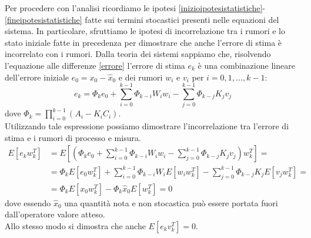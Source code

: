 Per procedere con l'analisi ricordiamo le ipotesi \eqref{inizioipotesistatistiche}-\eqref{fineipotesistatistiche} fatte sui termini stocastici presenti nelle equazioni del sistema.
In particolare, sfruttiamo le ipotesi di incorrelazione tra i rumori e lo stato iniziale fatte in precedenza per dimostrare che anche l'errore di stima è incorrelato con i rumori.
Dalla teoria dei sistemi sappiamo che, risolvendo l'equazione alle differenze \eqref{errore} l'errore di stima $e_k$ è una combinazione lineare dell'errore iniziale $e_0=x_0-\hat{x}_0$ e dei rumori $w_i$ e $v_i$ per $i=0,1,...,k-1$:
\begin{equation}
e_k=\Phi_{k}e_0 + \sum_{i=0}^{k-1}\Phi_{k-i}W_iw_i - \sum_{j=0}^{k-1}\Phi_{k-j}K_jv_j
\end{equation}
dove $\Phi_{k}=\prod_{i=0}^{k-1}(A_i-K_iC_i)$.\\
Utilizzando tale espressione possiamo dimostrare l'incorrelazione tra l'errore di stima e i rumori di processo e misura.
\begin{equation}
\begin{split}
E[e_kw_k^T]&=E[(\Phi_{k}e_0 + \sum_{i=0}^{k-1}\Phi_{k-i}W_iw_i - \sum_{j=0}^{k-1}\Phi_{k-j}K_jv_j)w_k^T]=\\
&=\Phi_kE[e_0w_k^T] + \sum_{i=0}^{k-1}\Phi_{k-i}W_iE[w_iw_k^T] - \sum_{j=0}^{k-1}\Phi_{k-j}K_jE[v_jw_k^T]=\\
&=\Phi_kE[x_0w_k^T] - \Phi_k\hat{x}_0E[w_k^T] = 0
\end{split}
\end{equation}
dove essendo $\hat{x}_0$ una quantità nota e non stocastica può essere portata fuori dall'operatore valore atteso.\\
Allo stesso modo si dimostra che anche $E[e_kv_k^T]=0$.
\newpage